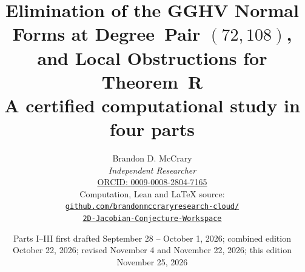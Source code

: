 \documentclass[a4paper,11pt]{article}
\theoremstyle{jsplain}
\theoremstyle{jsdef}
\theoremstyle{jsrem}
\begin{document}
\title{{Elimination of the GGHV Normal Forms at Degree~Pair $(72,108)$, and Local Obstructions for Theorem~R}\\[0.6em]
\large A certified computational study in four parts}
\author{Brandon D. McCrary\\[0.25em]
\textit{Independent Researcher}\\[0.25em]
\href{https://orcid.org/0009-0008-2804-7165}{ORCID: 0009-0008-2804-7165}\\[0.6em]
\small Computation, Lean and \LaTeX{} source:\\
\href{https://github.com/brandonmccraryresearch-cloud/2D-Jacobian-Conjecture-Workspace}{\nolinkurl{github.com/brandonmccraryresearch-cloud/}}\\
\href{https://github.com/brandonmccraryresearch-cloud/2D-Jacobian-Conjecture-Workspace}{\nolinkurl{2D-Jacobian-Conjecture-Workspace}}}
\date{Parts I--III first drafted September 28 -- October 1, 2026; combined edition October 22, 2026; revised November 4 and November 22, 2026; this edition November 25, 2026}
\maketitle
\end{document}
